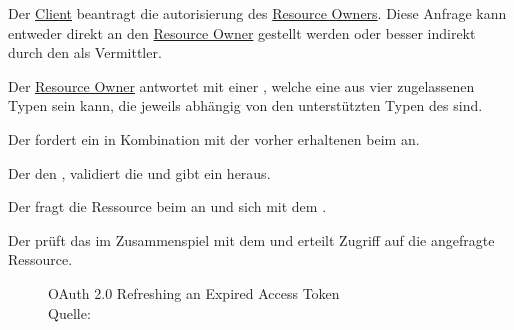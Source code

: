 		\begin{compactenum}[(A)]
			\item Der \hyperref[par:client]{Client} beantragt die \gls{autorisierung}
			des \hyperref[par:resource-owner]{Resource Owners}.
			Diese Anfrage kann entweder direkt an den \hyperref[par:resource-owner]{Resource Owner} gestellt werden
			oder besser indirekt durch den \hyperref[par:authorization-server]{\authorizationServer} als Vermittler.

			\item Der \hyperref[par:resource-owner]{Resource Owner} antwortet mit einer
			,
			welche eine aus vier zugelassenen Typen sein kann,
			die jeweils abhängig von den unterstützten Typen
			des \hyperref[par:authorization-server]{\authorizationServers} sind.

			\item Der \client{} fordert ein \accessToken{}
			in Kombination mit der vorher erhaltenen 
			beim \hyperref[par:authorization-server]{\authorizationServer} an.

			\item Der \hyperref[par:authorization-server]{\authorizationServer} 
			den \clienten,
			validiert die  und
			gibt ein \accessToken{} heraus.

			\item Der \client{} fragt die Ressource beim \hyperref[par:resource-server]{\resourceServer} an
			und  sich mit dem \accessToken.

			\item Der \hyperref[par:resource-server]{\resourceServer} prüft das 
			im Zusammenspiel mit dem \hyperref[par:authorization-server]{\authorizationServer} und
			erteilt Zugriff auf die angefragte Ressource.

		\end{compactenum}

		\vspace{1em}

		\begin{figure}[h]
			\centering
			\pgfplotsset{width=.8\textwidth}
			
			\caption[OAuth 2.0 Refreshing an Expired Access Token]
			{OAuth 2.0 Refreshing an Expired Access Token\label{fig:oauthrefreshToken}\\Quelle: }
		\end{figure}

